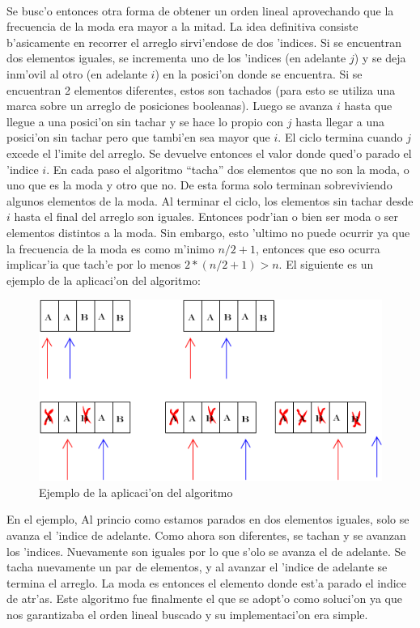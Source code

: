 \paragraph{}
Se busc'o entonces otra forma de  obtener un orden lineal aprovechando que la frecuencia de la moda 
era mayor a la mitad. La idea definitiva consiste b'asicamente en recorrer el  arreglo sirvi'endose de 
dos 'indices. Si se encuentran dos elementos iguales, se incrementa uno de los 'indices (en adelante $j$) 
y se deja inm'ovil al otro (en adelante $i$) en la posici'on donde se encuentra. Si se encuentran 2 
elementos diferentes, estos son tachados (para esto se utiliza una marca sobre un arreglo de posiciones booleanas). 
Luego se avanza $i$ hasta que llegue a una posici'on sin tachar y se hace lo propio con $j$ hasta llegar 
a una posici'on sin tachar pero que tambi'en sea mayor que $i$. El ciclo termina cuando $j$ excede el l'imite 
del arreglo. Se devuelve entonces el valor donde qued'o parado el 'indice $i$. 
En cada paso el algoritmo ``tacha'' dos elementos que no son la moda, o uno que es la moda y otro que no. 
De esta forma solo terminan sobreviviendo algunos elementos de la moda. Al terminar el ciclo, los elementos
sin tachar desde $i$ hasta el final del arreglo son iguales. Entonces podr'ian o bien ser moda o ser elementos 
distintos a la moda. Sin embargo, esto 'ultimo no puede ocurrir ya que la frecuencia de la moda es como m'inimo 
$n/2+1$, entonces que eso ocurra implicar'ia que tach'e por lo menos $2*(n/2+1) > n$.
El siguiente es un ejemplo de la aplicaci'on del algoritmo:
\begin{figure}[H]
\centering
\includegraphics[scale=0.7]{./ejemplo.png}
\caption{Ejemplo de la aplicaci'on del algoritmo}
\end{figure}
En el ejemplo, Al princio como estamos parados en dos elementos iguales, solo se avanza el 'indice de adelante. 
Como ahora son diferentes, se tachan y se avanzan los 'indices. Nuevamente son iguales por lo que s'olo 
se avanza el de adelante. Se tacha nuevamente un par de elementos, y al avanzar el 'indice de adelante se 
termina el arreglo. La moda es entonces el elemento donde est'a parado el indice de atr'as.
Este algoritmo fue finalmente el que se adopt'o como soluci'on ya que nos garantizaba el orden lineal 
buscado y su implementaci'on era simple.

